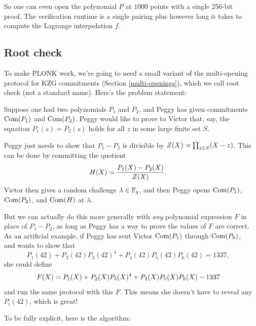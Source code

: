 So one can even open the polynomial $P$ at $1000$ points with a
single 256-bit proof. The verification runtime is a single pairing plus
however long it takes to compute the Lagrange interpolation $f$.

\subsection{Root check}
To make PLONK work, we're going to need a small variant of the
multi-opening protocol for KZG commitments
(Section \ref{multi-openings}), which we call
\alert{root check} (not a standard name). Here's the problem statement:

\begin{goal}{}{}
Suppose one had two polynomials $P_1$ and $P_2$,
and Peggy has given commitments
$\operatorname{Com}(P_1)$ and $\operatorname{Com}(P_2)$.
Peggy would like to prove to Victor that, say,
the equation $P_1(z) = P_2(z)$ holds for all $z$ in some large finite set $S$.
\end{goal}

Peggy just needs to show that $P_{1} - P_{2}$ is divisible by
$Z(X) \defeq \prod_{z \in S}(X - z)$. This can be done by committing the
quotient \[H(X) \defeq \frac{P_{1}(X) - P_{2}(X)}{Z(X)}.\] Victor then gives
a random challenge $\lambda \in \mathbb{F}_{q}$, and then Peggy opens
$\operatorname{Com}( P_{1} )$,
$\operatorname{Com}( P_{2} )$, and $\operatorname{Com}(H)$ at
$\lambda$.

But we can actually do this more generally with \emph{any} polynomial
expression $F$ in place of $P_{1} - P_{2}$, as long as Peggy has a
way to prove the values of $F$ are correct. As an artificial example,
if Peggy has sent Victor $\operatorname{Com}( P_{1} )$ through
$\operatorname{Com}( P_{6} )$, and wants to show that
\[P_{1}(42) + P_{2}(42)P_{3}(42)^{4} + P_{4}(42)P_{5}(42)P_{6}(42) = 1337,\]
she could define
\[F(X) \defeq P_{1}(X) + P_{2}(X)P_{3}(X)^{4} + P_{4}(X)P_{5}(X)P_{6}(X) - 1337\]
and run the same protocol with this $F$. This means she doesn't have
to reveal any $P_{i}(42)$, which is great!

To be fully explicit, here is the algorithm:

